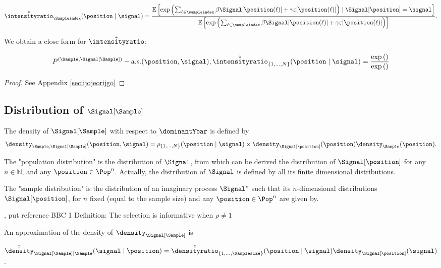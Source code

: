 $$\tilde{\tilde{\intensityratio}}_{\Sampleindex}(\position\mid\signal)=
\frac{
\mathrm{E}\left[\exp\left(\sum_{\ell\in\sampleindex}\beta \Signal[\position(\ell)]+\gamma \varepsilon[\position(\ell)]\right)\mid \Signal[\position]=\signal\right]}{
\mathrm{E}\left[\exp\left(\sum_{\ell\in\sampleindex}\beta \Signal[\position(\ell)]+\gamma \varepsilon[\position(\ell)]\right)\right]}.$$

We obtain a close form for 
$\tilde{\tilde{\intensityratio}}$:

\begin{equation}
P^{(\Sample,\Signal[\Sample])}-\text{a.s.}(\position,\signal),
\tilde{\tilde{\intensityratio}}_{\{1,\ldots,N\}}(\position\mid\signal)=
\frac{\exp\left(\right)}{\exp\left(\right)}\label{eq:kjeojmcxzmxz}
\end{equation}
\begin{proof}
See Appendix \ref{sec:ijojeorijgo}
\end{proof}

\subsection{Distribution of $\Signal[\Sample]$}
The density of $\Signal[\Sample]$ with respect to $\dominantYbar$ is defined by
$$\density_{\Sample,\Signal[\Sample]}(\position,\signal)=\rho_{\{1,\ldots,N\}}(\position\mid\signal)\times \density_{\Signal[\position]}(\position)\density_{\Sample}(\position).$$

The "population distribution" is the distribution of $\Signal$, from which can be derived the distribution of $\Signal[\position]$ for any $n\in\mathbb{N}$, and any $\position\in \Pop^n$. Actually, the distribution of $\Signal$ is defined by all its finite dimensional distributions.

The "sample distribution" is the distribution of an imaginary process $\Signal^\star$ such that its $n$-dimensional distributions $\Signal[\position]$, for $n$ fixed (equal to the sample size) and any $\position \in\Pop^n$ are given by.

\cite{pfefferman_1992}, {\color{red} put reference BBC 1
}
Definition: The selection is informative when $\rho\neq1$



An approximation of the density of $\density_{\Signal[\Sample]}$ is

$\tilde{\tilde{\density}}_{\Signal[\Sample]\mid\Sample}(\signal\mid\position)=
\tilde{\tilde{\densityratio}}_{\{1,\ldots,\Samplesize\}}(\position\mid\signal)\density_{\Signal[\position]}(\signal)$.


